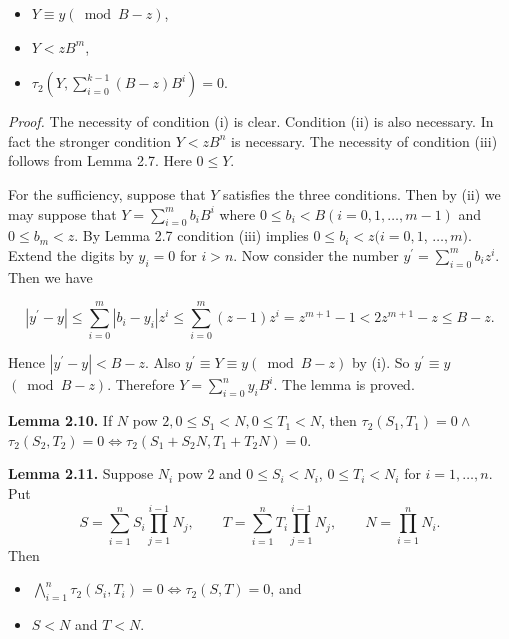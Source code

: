 \documentclass[11pt,a4paper]{article}
\begin{document}
\begin{itemize}
  \item[(i)] $Y \equiv y(\bmod B-z)$,
  \item[(ii)] $Y<z B^{m}$,
  \item[(iii)] $\tau_{2}\left(Y,\allowbreak  \sum_{i=0}^{k-1}(B-z) B^{i}\right)=0$.
\end{itemize}

\noindent\emph{Proof.} The necessity of condition (i) is clear. Condition (ii) is also necessary. In fact the stronger condition $Y<z B^{n}$ is necessary. The necessity of condition (iii) follows from Lemma 2.7. Here $0 \leq Y$.

For the sufficiency, suppose that $Y$ satisfies the three conditions. Then by (ii) we may suppose that $Y=\sum_{i=0}^{m} b_{i} B^{i}$ where $0 \leq b_{i}<B(i=0,\allowbreak 1,\allowbreak  \ldots,\allowbreak  m-1)$ and $0 \leq b_{m}<z$. By Lemma 2.7 condition (iii) implies $0 \leq b_{i}<z(i=0,\allowbreak 1$, $\ldots,\allowbreak  m)$. Extend the digits by $y_i=0$ for $i>n$. Now consider the number $y^{\prime}=\sum_{i=0}^{m} b_{i} z^{i}$. Then we have

\[
\left|y^{\prime}-y\right| \leq \sum_{i=0}^{m}\left|b_{i}-y_{i}\right| z^{i} \leq \sum_{i=0}^{m}(z-1) z^{i}=z^{m+1}-1<2 z^{m+1}-z \leq B-z .
\]

Hence $\left|y^{\prime}-y\right|<B-z$. Also $y^{\prime} \equiv Y \equiv y(\bmod B-z)$ by (i). So $y^{\prime} \equiv y$ $(\bmod B-z)$. Therefore $Y=\sum_{i=0}^{n} y_{i} B^{i}$. The lemma is proved.

\noindent\textbf{Lemma 2.10.} If $N$ pow $2,\allowbreak 0 \leq S_{1}<N,\allowbreak  0 \leq T_{1}<N$, then $\tau_{2}\left(S_{1},\allowbreak  T_{1}\right)=0 \wedge$ $\tau_{2}\left(S_{2},\allowbreak  T_{2}\right)=0 \Leftrightarrow \tau_{2}\left(S_{1}+S_{2} N,\allowbreak  T_{1}+T_{2} N\right)=0$.

\noindent\textbf{Lemma 2.11.} Suppose $N_i$ pow $2$ and
$0\leq S_i<N_i$, $0\leq T_i<N_i$ for $i=1,\ldots,n$. Put
\[
 S=\sum_{i=1}^{n}S_i\prod_{j=1}^{i-1}N_j,\qquad
 T=\sum_{i=1}^{n}T_i\prod_{j=1}^{i-1}N_j,\qquad
 N=\prod_{i=1}^{n}N_i.
\]
Then

\begin{itemize}
  \item[(i)] $\bigwedge_{i=1}^{n} \tau_{2}\left(S_{i},\allowbreak T_{i}\right)=0 \Leftrightarrow \tau_{2}(S,\allowbreak  T)=0$, and
  \item[(ii)] $S<N$ and $T<N$.
\end{itemize}
\end{document}
